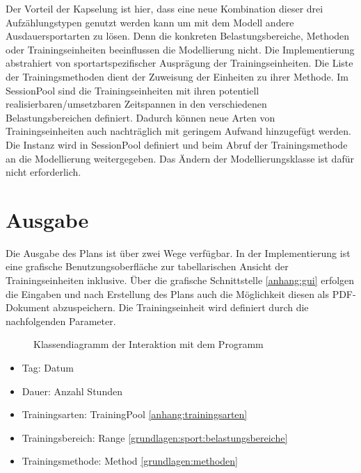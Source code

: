 Der Vorteil der Kapselung ist hier, dass eine neue Kombination dieser drei Aufzählungstypen genutzt werden kann um mit dem Modell andere Ausdauersportarten zu lösen. Denn die konkreten Belastungsbereiche, Methoden oder Trainingseinheiten beeinflussen die Modellierung nicht. Die Implementierung abstrahiert von sportartspezifischer Ausprägung der Trainingseinheiten. Die Liste der Trainingsmethoden dient der Zuweisung der Einheiten zu ihrer Methode. Im SessionPool sind die Trainingseinheiten mit ihren potentiell realisierbaren/umsetzbaren Zeitspannen in den verschiedenen Belastungsbereichen definiert. Dadurch können neue Arten von Trainingseinheiten auch nachträglich mit geringem Aufwand hinzugefügt werden. Die Instanz wird in SessionPool definiert und beim Abruf der Trainingsmethode an die Modellierung weitergegeben. Das Ändern der Modellierungsklasse ist dafür nicht erforderlich.

\section{Ausgabe}
\label{sec:modellierung:output}
Die Ausgabe des Plans ist über zwei Wege verfügbar. In der Implementierung ist eine grafische Benutzungsoberfläche zur tabellarischen Ansicht der Trainingseinheiten inklusive. Über die grafische Schnittstelle \ref{anhang:gui} erfolgen die Eingaben und nach Erstellung des Plans auch die Möglichkeit diesen als PDF-Dokument abzuspeichern. Die Trainingseinheit wird definiert durch die nachfolgenden Parameter.
\begin{figure}[h]
    \caption{Klassendiagramm der Interaktion mit dem Programm}
    \label{fig:uml:solver}
\end{figure}
\begin{itemize}
    \item Tag: Datum
    \item Dauer: Anzahl Stunden
    \item Trainingsarten: TrainingPool \ref{anhang:trainingsarten}
    \item Trainingsbereich: Range \ref{grundlagen:sport:belastungsbereiche}
    \item Trainingsmethode: Method \ref{grundlagen:methoden}
\end{itemize}

